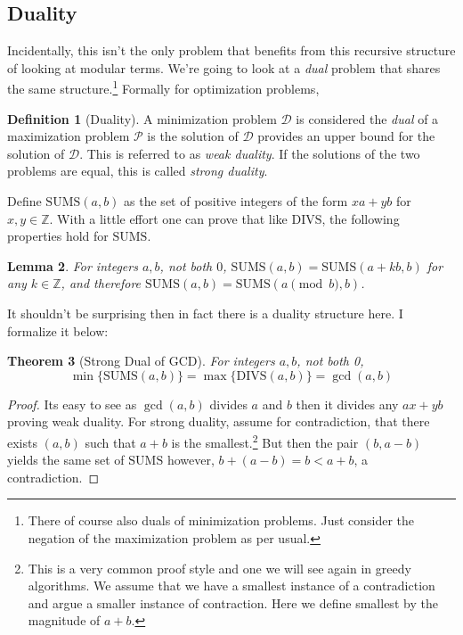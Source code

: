 \documentclass[11pt]{article}
\theoremstyle{plain}
\newtheorem{thm}{Theorem}[section] %
\newtheorem{lem}[thm]{Lemma}
\theoremstyle{definition}
\newtheorem{defn}[thm]{Definition} %
\newcommand{\ZZ}{\mathbb{Z}}
\numberwithin{equation}{section}
\numberwithin{figure}{section}
\begin{document}
\subsection{Duality}

\noindent Incidentally, this isn't the only problem that benefits from this recursive structure of looking at modular terms. We're going to look at a \emph{dual} problem that shares the same structure.\footnote{There of course also duals of minimization problems. Just consider the negation of the maximization problem as per usual.} Formally for optimization problems,

\begin{framed}
\begin{defn}[Duality]
A minimization problem $\mathcal{D}$ is considered the \emph{dual} of a maximization problem $\mathcal{P}$ is the solution of $\mathcal{D}$ provides an upper bound for the solution of $\mathcal{D}$. This is referred to as \emph{weak duality}. If the solutions of the two problems are equal, this is called \emph{strong duality}.
\end{defn}
\end{framed}

\noindent Define $\mathrm{SUMS}(a,b)$ as the set of positive integers of the form $xa + yb$ for $x, y \in \ZZ$. With a little effort one can prove that like $\mathrm{DIVS}$, the following properties hold for $\mathrm{SUMS}$.

\begin{lem}
For integers $a,b$, not both $0$, $\mathrm{SUMS}(a,b) = \mathrm{SUMS}(a + kb, b)$ for any $k \in \ZZ$, and therefore $\mathrm{SUMS}(a,b) = \mathrm{SUMS}(a \pmod b, b)$. 
\end{lem}

\noindent It shouldn't be surprising then in fact there is a duality structure here. I formalize it below:

\begin{thm}[Strong Dual of GCD]
For integers $a, b$, not both 0, 
\begin{equation}
\min \{\mathrm{SUMS}(a,b) \} = \max \{ \mathrm{DIVS}(a,b)\} = \gcd(a,b)
\end{equation}
\end{thm}

\begin{proof}
Its easy to see as $\gcd(a,b)$ divides $a$ and $b$ then it divides any $ax + yb$ proving weak duality. For strong duality, assume for contradiction, that there exists $(a,b)$ such that $a + b$ is the smallest.\footnote{This is a very common proof style and one we will see again in greedy algorithms. We assume that we have a smallest instance of a contradiction and argue a smaller instance of contraction. Here we define smallest by the magnitude of $a + b$.} But then the pair $(b, a - b)$ yields the same set of $\mathrm{SUMS}$ however, $b + (a - b) = b < a + b$, a contradiction.
\end{proof}
\end{document}
